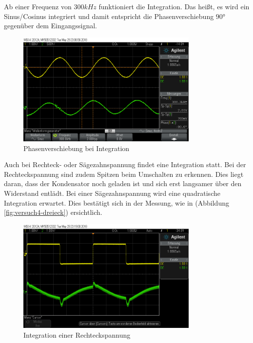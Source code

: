 \documentclass[a4paper]{article}
\begin{document}
Ab einer Frequenz von $300\si{kHz}$ funktioniert die Integration. Das heißt, es wird ein Sinus/Cosinus integriert und damit entspricht die Phasenverschiebung $\ang{90}$ gegenüber dem Eingangssignal.


\begin{figure}[H]
    \centering
    \includegraphics[width=0.8\textwidth]{versuch4/versuch4_phase.png}
    \caption{Phasenverschiebung bei Integration}
    \label{fig:versuch4-phase}
\end{figure}

Auch bei Rechteck- oder Sägezahnspannung findet eine Integration statt.
Bei der Rechteckspannung sind zudem Spitzen beim Umschalten zu erkennen. Dies liegt daran, dass der Kondensator noch geladen ist und sich erst langsamer über den Widerstand entlädt.
Bei einer Sägezahnspannung wird eine quadratische Integration erwartet. Dies bestätigt sich in der Messung, wie in (Abbildung \ref{fig:versuch4-dreieck}) ersichtlich.

\begin{figure}[H]
    \centering
    \includegraphics[width=0.8\textwidth]{versuch4/versuch4_rechteck.png}
    \caption{Integration einer Rechteckspannung}
    \label{fig:versuch4-rechteck}
\end{figure}
\end{document}
